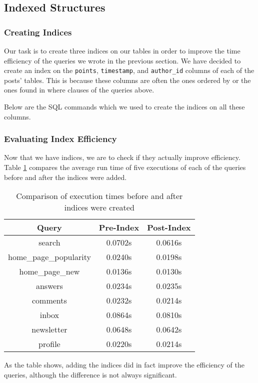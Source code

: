 \subsection{Indexed Structures}

\subsubsection{Creating Indices}

Our task is to create three indices on our tables in order to improve the time efficiency of the queries we wrote in the previous section. We have decided to create an index on the \verb`points`, \verb`timestamp`, and \verb`author_id` columns of each of the posts' tables. This is because these columns are often the ones ordered by or the ones found in where clauses of the queries above.

Below are the SQL commands which we used to create the indices on all these columns.


\subsubsection{Evaluating Index Efficiency}

Now that we have indices, we are to check if they actually improve efficiency. Table \ref{index-comparison} compares the average run time of five executions of each of the queries before and after the indices were added.

\begin{table}[htbp]
	\centering
	\begin{tabular}{||c||c|c||}
		\hline
		Query & Pre-Index & Post-Index \\
		\hline
		search & 0.0702s & 0.0616s \\
		home\_page\_popularity & 0.0240s & 0.0198s \\
		home\_page\_new & 0.0136s & 0.0130s \\
		answers & 0.0234s & 0.0235s \\
		comments & 0.0232s & 0.0214s \\
		inbox & 0.0864s & 0.0810s \\
		newsletter & 0.0648s & 0.0642s \\
		profile & 0.0220s & 0.0214s \\
		\hline
	\end{tabular}
	\caption{Comparison of execution times before and after indices were created}
	\label{index-comparison}
\end{table}

As the table shows, adding the indices did in fact improve the efficiency of the queries, although the difference is not always significant.